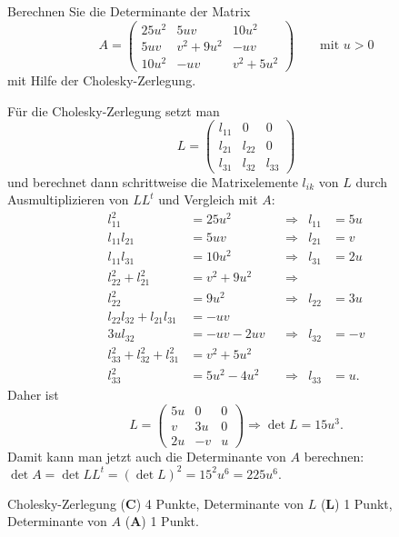 %
Berechnen Sie die Determinante der Matrix 
\[
A=
\begin{pmatrix}
25u^2 &     5uv   & 10u^2 \\
5uv   &  v^2+9u^2 & -uv   \\
10u^2 &     -uv   & v^2+5u^2
\end{pmatrix}
\qquad\text{mit $u>0$}
\]
mit Hilfe der Cholesky-Zerlegung.


\begin{loesung}
Für die Cholesky-Zerlegung setzt man 
\[
L = \begin{pmatrix}
l_{11}& 0 & 0 \\
l_{21}&l_{22}& 0 \\
l_{31}&l_{32}&l_{33}
\end{pmatrix}
\]
und berechnet dann schrittweise die Matrixelemente $l_{ik}$ von $L$
durch Ausmultiplizieren von $LL^t$ und Vergleich mit $A$:
\[
\begin{aligned}
l_{11}^2                   &=  25u^2       &&\Rightarrow&    l_{11} &= 5u  \\
l_{11}l_{21}               &=  5uv         &&\Rightarrow&    l_{21} &= v   \\
l_{11}l_{31}               &=  10u^2       &&\Rightarrow&    l_{31} &= 2u  \\
l_{22}^2+l_{21}^2          &=  v^2 + 9u^2  &&\Rightarrow&           &      \\
l_{22}^2                   &=  9u^2        &&\Rightarrow&    l_{22} &= 3u  \\
l_{22}l_{32}+l_{21}l_{31}  &=  -uv         &&           &           &      \\
3ul_{32}                   &= -uv-2uv      &&\Rightarrow&    l_{32} &= -v  \\
l_{33}^2+l_{32}^2+l_{31}^2 &=  v^2+5u^2    &&           &           &      \\
l_{33}^2                   &=  5u^2-4u^2   &&\Rightarrow&    l_{33} &=  u.
\end{aligned}
\]
Daher ist
\[
L=\begin{pmatrix}
 5u &  0 & 0 \\
  v & 3u & 0 \\
 2u & -v & u
\end{pmatrix}
\Rightarrow
\det L
=
15u^3.
\]
Damit kann man jetzt auch die Determinante von $A$ berechnen:
$\det A = \det LL^t = (\det L)^2 = 15^2u^6 = 225u^6.$
\end{loesung}

\begin{bewertung}
Cholesky-Zerlegung ({\bf C}) 4 Punkte,
Determinante von $L$ ({\bf L}) 1 Punkt,
Determinante von $A$ ({\bf A}) 1 Punkt.
\end{bewertung}

